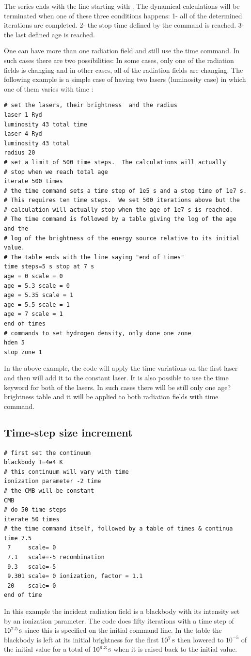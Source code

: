 \begin{shaded}
The series ends with the line
starting with . The dynamical calculations will be terminated when one of these three conditions happens:
1- all of the determined iterations are completed.
2- the stop time defined by the  command is reached.
3- the last defined age is reached.

One can have more than one radiation field and still use the time command. In such cases there are two possibilities: In some cases, only one of the radiation fields is changing and in other cases, all of the radiation fields are changing. The following example is a simple case of having two lasers  (luminosity case) in which one of them varies with time :

\begin{verbatim}
# set the lasers, their brightness  and the radius
laser 1 Ryd
luminosity 43 total time
laser 4 Ryd
luminosity 43 total 
radius 20
# set a limit of 500 time steps.  The calculations will actually
# stop when we reach total age
iterate 500 times
# the time command sets a time step of 1e5 s and a stop time of 1e7 s.
# This requires ten time steps.  We set 500 iterations above but the
# calculation will actually stop when the age of 1e7 s is reached.
# The time command is followed by a table giving the log of the age and the
# log of the brightness of the energy source relative to its initial value.
# The table ends with the line saying "end of times"
time steps=5 s stop at 7 s
age = 0 scale = 0
age = 5.3 scale = 0
age = 5.35 scale = 1
age = 5.5 scale = 1
age = 7 scale = 1
end of times
# commands to set hydrogen density, only done one zone
hden 5
stop zone 1
\end{verbatim}

In the above example, the code will apply the time variations on the first laser and then will add it to the constant laser. It is also possible to use the time keyword for both of the lasers. In such cases there will be still only one  age?brightness table and it will be applied to both radiation fields with time command. 


\subsection{Time-step size increment}
\begin{verbatim}
# first set the continuum
blackbody T=4e4 K
# this continuum will vary with time
ionization parameter -2 time
# the CMB will be constant
CMB
# do 50 time steps
iterate 50 times
# the time command itself, followed by a table of times & continua
time 7.5
 7     scale= 0
 7.1   scale=-5 recombination
 9.3   scale=-5
 9.301 scale= 0 ionization, factor = 1.1
 20    scale= 0
end of time
\end{verbatim}
In this example the incident radiation field is a blackbody
with its intensity set by an ionization parameter.
The code does fifty iterations with a time step of
$10^{7.5} {\rm\thinspace s}$ since this is specified on the initial  command line.
In the
table the blackbody is left at its initial brightness
for the first $10^7 {\rm\thinspace s}$ then
lowered to $10^{-5}$ of the initial value
for a total of $10^{9.3} {\rm\thinspace s}$ when it is
raised back to the initial value.


\end{shaded}
